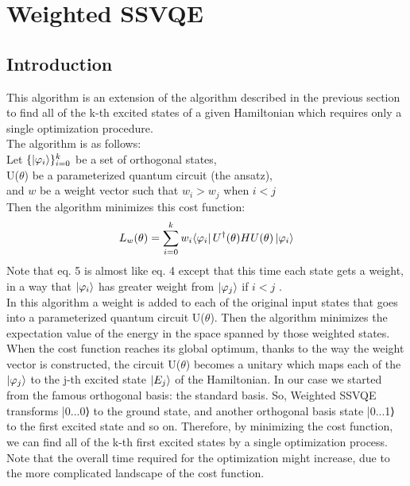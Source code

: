 \documentclass[12pt, a4paper]{article}
\begin{document}
    \section{Weighted SSVQE}
    \subsection{Introduction}
    This algorithm is an extension of the algorithm described in the previous
    section to find all of the k-th excited states of a given Hamiltonian which requires only a single optimization procedure.\\
    The algorithm is as follows:\\
    Let $\{\ket{\varphi_i}\}_{i=0}^k$ be a set of orthogonal states,\\
    U($\theta$) be a parameterized quantum circuit (the ansatz),\\
    and $w$ be a weight vector such that $w_i > w_j$ when $i < j$\\
    Then the algorithm minimizes this cost function:
    \begin{equation}
        L_w(\theta) =\sum_{i=0}^{k}w_i{\bra{\varphi_i} U^{\dagger}(\theta) H U(\theta) \ket{\varphi_i}}
    \end{equation}
    Note that eq. 5 is almost like eq. 4 except that this time each state gets a weight,
    in a way that $\ket{\varphi_i}$ has greater weight from $\ket{\varphi_j}$ if $i < j$ .\\
    In this algorithm a weight is added to each of the original input states that goes into a parameterized quantum circuit U($\theta$). Then the algorithm minimizes the expectation value of the energy in the space spanned by those weighted states. When the cost function reaches its global optimum, thanks to the way the weight vector is constructed, the circuit U($\theta$) becomes a unitary which maps each of the $\ket{\varphi_j}$ to the j-th
    excited state
    $\ket{E_j}$ of the Hamiltonian. In our case we started from the famous orthogonal basis: the standard basis. So, Weighted SSVQE transforms |0...0⟩ to the ground state, and another orthogonal basis state |0...1⟩ to the first excited state and so on.
    Therefore, by minimizing the cost function, we can find all of the k-th first excited states by
    a single optimization process. Note that the overall time
    required for the optimization might increase, due to the
    more complicated landscape of the cost function.\\
\end{document}
